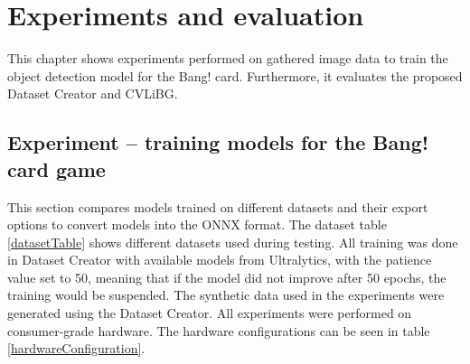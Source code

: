 
% 
\chapter{Experiments and evaluation}
This chapter shows experiments performed on gathered image data to train the object detection model for the Bang! card. Furthermore, it evaluates the proposed Dataset Creator and CVLiBG.



\section{Experiment -- training models for the Bang! card game}
\label{bangTrainingExperiments}
This section compares models trained on different datasets and their export options to convert models into the ONNX format. The dataset table \ref{datasetTable} shows different datasets used during testing. All training was done in Dataset Creator with available models from Ultralytics, with the patience value set to 50, meaning that if the model did not improve after 50 epochs, the training would be suspended. The synthetic data used in the experiments were generated using the Dataset Creator. All experiments were performed on consumer-grade hardware. The hardware configurations can be seen in table \ref{hardwareConfiguration}.

